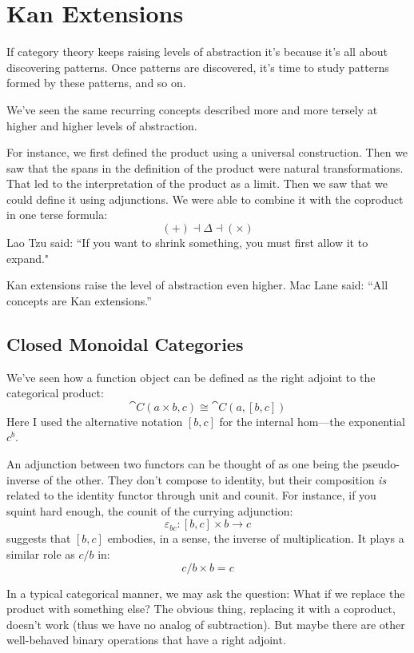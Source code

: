 \documentclass[DaoFP]{subfiles}
\begin{document}
\setcounter{chapter}{19}

\chapter{Kan Extensions}

If category theory keeps raising levels of abstraction it's because it's all about discovering patterns. Once patterns are discovered, it's time to study patterns formed by these patterns, and so on. 

We've seen the same recurring concepts described more and more tersely at higher and higher levels of abstraction. 

For instance, we first defined the product using a universal construction. Then we saw that the spans in the definition of the product were natural transformations. That led to the interpretation of the product as a limit. Then we saw that we could define it using adjunctions. We were able to combine it with the coproduct in one terse formula:
\[ (+) \dashv \Delta \dashv (\times) \]
Lao Tzu said: ``If you want to shrink something, you must first allow it to expand."

Kan extensions raise the level of abstraction even higher. Mac Lane said: ``All concepts are Kan extensions.''

\section{Closed Monoidal Categories}

We've seen how a function object can be defined as the right adjoint to the categorical product:
\[ \cat C (a \times b, c) \cong \cat C (a, [b, c]) \]
Here I used the alternative notation $[b, c]$ for the internal hom---the exponential $c^b$. 

An adjunction between two functors can be thought of as one being the pseudo-inverse of the other. They don't compose to identity, but their composition \emph{is} related to the identity functor through unit and counit. For instance, if you squint hard enough, the counit of the currying adjunction:
\[ \varepsilon_{b c} \colon [b, c] \times b \to c \]
suggests that $[b, c]$ embodies, in a sense, the inverse of multiplication. It plays a similar role as $c/b$ in:
\[ c/b \times b = c \]

In a typical categorical manner, we may ask the question: What if we replace the product with something else? The obvious thing, replacing it with a coproduct, doesn't work (thus we have no analog of subtraction). But maybe there are other well-behaved binary operations that have a right adjoint.
\end{document}
